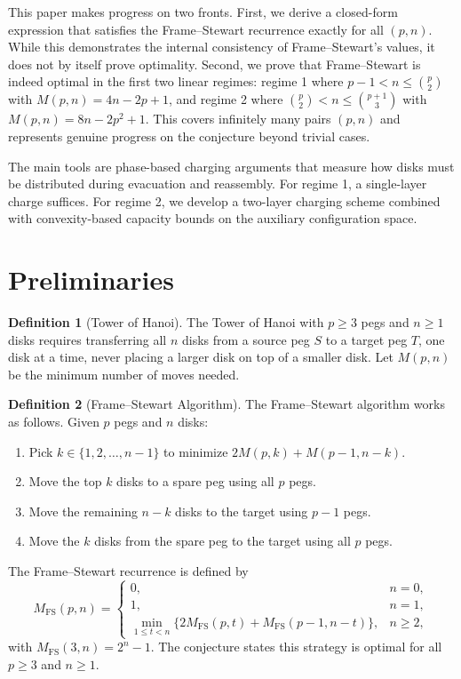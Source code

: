 \documentclass[11pt]{article}
\theoremstyle{definition}
\newtheorem{definition}{Definition}
\begin{document}
This paper makes progress on two fronts. First, we derive a closed-form expression that satisfies the Frame--Stewart recurrence exactly for all $(p,n)$. While this demonstrates the internal consistency of Frame--Stewart's values, it does not by itself prove optimality. Second, we prove that Frame--Stewart is indeed optimal in the first two linear regimes: regime 1 where $p-1 < n \leq \binom{p}{2}$ with $M(p,n) = 4n - 2p + 1$, and regime 2 where $\binom{p}{2} < n \leq \binom{p+1}{3}$ with $M(p,n) = 8n - 2p^2 + 1$. This covers infinitely many pairs $(p,n)$ and represents genuine progress on the conjecture beyond trivial cases.

The main tools are phase-based charging arguments that measure how disks must be distributed during evacuation and reassembly. For regime 1, a single-layer charge suffices. For regime 2, we develop a two-layer charging scheme combined with convexity-based capacity bounds on the auxiliary configuration space.

\section{Preliminaries}

\begin{definition}[Tower of Hanoi]
The Tower of Hanoi with $p \geq 3$ pegs and $n \geq 1$ disks requires transferring all $n$ disks from a source peg $S$ to a target peg $T$, one disk at a time, never placing a larger disk on top of a smaller disk. Let $M(p,n)$ be the minimum number of moves needed.
\end{definition}

\begin{definition}[Frame--Stewart Algorithm]
The Frame--Stewart algorithm works as follows. Given $p$ pegs and $n$ disks:
\begin{enumerate}[label=(\roman*), itemsep=1pt]
\item Pick $k \in \{1,2,\dots,n-1\}$ to minimize $2M(p,k)+M(p-1,n-k)$.
\item Move the top $k$ disks to a spare peg using all $p$ pegs.
\item Move the remaining $n-k$ disks to the target using $p-1$ pegs.
\item Move the $k$ disks from the spare peg to the target using all $p$ pegs.
\end{enumerate}
The Frame--Stewart recurrence is defined by
\begin{equation}\label{eq:FS}
M_{\mathrm{FS}}(p,n) = \begin{cases}
0, & n = 0, \\
1, & n = 1, \\
\displaystyle\min_{1 \leq t < n} \{2M_{\mathrm{FS}}(p,t) + M_{\mathrm{FS}}(p-1,n-t)\}, & n \geq 2,
\end{cases}
\end{equation}
with $M_{\mathrm{FS}}(3,n) = 2^n - 1$. The conjecture states this strategy is optimal for all $p \geq 3$ and $n \geq 1$.
\end{definition}
\end{document}
